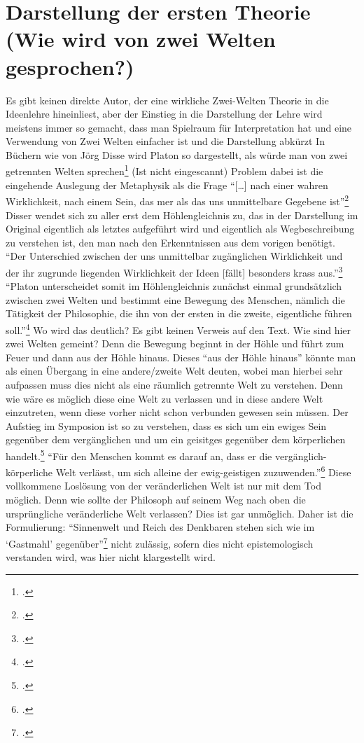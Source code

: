 \documentclass[12pt]{article}
\begin{document}
\section{Darstellung der ersten Theorie (Wie wird von zwei Welten gesprochen?)}
Es gibt keinen direkte Autor, der eine wirkliche Zwei-Welten Theorie in die Ideenlehre hineinliest, aber der Einstieg in die Darstellung der Lehre wird meistens immer so gemacht, dass man Spielraum für Interpretation hat und eine Verwendung von Zwei Welten einfacher ist und die Darstellung abkürzt 
In Büchern wie von Jörg Disse wird Platon so dargestellt, als würde man von zwei getrennten Welten sprechen\footcite[vgl.][S. 22 und 28]{DisseMetaphysik} (Ist nicht eingescannt)
Problem dabei ist die eingehende Auslegung der Metaphysik als die Frage \enquote{[\dots] nach einer wahren Wirklichkeit, nach einem Sein, das mer als das uns unmittelbare Gegebene ist}\footcite[vgl.][S. 17]{DisseMetaphysik}
Disser wendet sich zu aller erst dem Höhlengleichnis zu, das in der Darstellung im Original eigentlich als letztes aufgeführt wird und eigentlich als Wegbeschreibung zu verstehen ist, den man nach den Erkenntnissen aus dem vorigen benötigt. 
\enquote{Der Unterschied zwischen der uns unmittelbar zugänglichen Wirklichkeit und der ihr zugrunde liegenden Wirklichkeit der Ideen [fällt] besonders krass aus.}\footcite[vgl.][S. 22]{DisseMetaphysik}
\enquote{Platon unterscheidet somit im Höhlengleichnis zunächst einmal grundsätzlich zwischen zwei Welten und bestimmt eine Bewegung des Menschen, nämlich die Tätigkeit der Philosophie, die ihn von der ersten in die zweite, eigentliche führen soll.}\footcite[][S. 23f.]{DisseMetaphysik} Wo wird das deutlich? Es gibt keinen Verweis auf den Text. Wie sind hier zwei Welten gemeint? Denn die Bewegung beginnt in der Höhle und führt zum Feuer und dann aus der Höhle hinaus. Dieses \enquote{aus der Höhle hinaus} könnte man als einen Übergang in eine andere/zweite Welt deuten, wobei man hierbei sehr aufpassen muss dies nicht als eine räumlich getrennte Welt zu verstehen. Denn wie wäre es möglich diese eine Welt zu verlassen und in diese andere Welt einzutreten, wenn diese vorher nicht schon verbunden gewesen sein müssen.
Der Aufstieg im Symposion ist so zu verstehen, dass es sich um ein ewiges Sein gegenüber dem vergänglichen und um ein geisitges gegenüber dem körperlichen handelt.\footcite[vgl.][S. 27f.]{DisseMetaphysik} \enquote{Für den Menschen kommt es darauf an, dass er die vergänglich-körperliche Welt verlässt, um sich alleine der ewig-geistigen zuzuwenden.}\footcite[][S. 28]{DisseMetaphysik} Diese vollkommene Loslösung von der veränderlichen Welt ist nur mit dem Tod möglich. Denn wie sollte der Philosoph auf seinem Weg nach oben die ursprüngliche veränderliche Welt verlassen? Dies ist gar unmöglich. Daher ist die Formulierung: \enquote{Sinnenwelt und Reich des Denkbaren stehen sich wie im \enquote{Gastmahl} gegenüber}\footcite[][S. 28]{DisseMetaphysik} nicht zulässig, sofern dies nicht epistemologisch verstanden wird, was hier nicht klargestellt wird.
\end{document}
